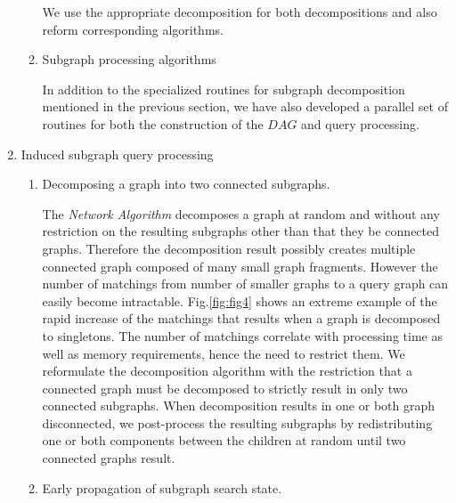 \begin{enumerate}
\begin{enumerate}
We use the appropriate decomposition for both decompositions and also reform corresponding algorithms.

\item Subgraph processing algorithms

In addition to the specialized routines for subgraph decomposition mentioned in the previous section,  we have also developed a parallel set of routines for both the construction of the $DAG$ and query processing. 

\end{enumerate}


\item Induced subgraph query processing

\begin{enumerate}
\item Decomposing a graph into two connected subgraphs.

The \textit{Network Algorithm} decomposes a graph at random and without any restriction on the resulting subgraphs other than that they be connected graphs.
Therefore the decomposition result possibly creates multiple connected graph composed of many small graph fragments.
However the number of matchings from number of smaller graphs to a query graph can easily become intractable.
Fig.\ref{fig:fig4} shows an extreme example of the rapid increase of the matchings that results when a graph is decomposed to singletons.
The number of matchings correlate with processing time as well as memory requirements, hence the need to restrict them. We reformulate the decomposition algorithm with the restriction that a connected graph must be decomposed to strictly result in only two connected subgraphs. When decomposition results in one or both graph disconnected, we post-process the resulting subgraphs by redistributing one or both components between the children  at random until two connected graphs result.


\item Early propagation of subgraph search state.


\end{enumerate}
\end{enumerate}
